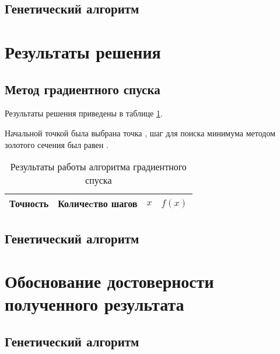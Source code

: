 \documentclass[10pt,a4paper,titlepage]{article}
\begin{document}
\subsection{Генетический алгоритм}

\section{Результаты решения}
\subsection{Метод градиентного спуска}
Результаты решения приведены в таблице \ref{gd-result-table}. 

Начальной точкой была выбрана точка , 
шаг для поиска минимума методом золотого сечения был равен .

\begin{table}[H]
\caption{Результаты работы алгоритма градиентного спуска}
\label{gd-result-table}
\begin{center}
\begin{tabular}{|c|c|c|c|}
\hline
Точность & Количеcтво шагов & $x$ & $f(x)$ \\
\hline

\hline
\end{tabular}
\end{center}
\end{table}

\subsection{Генетический алгоритм}



\section{Обоснование достоверности полученного результата}

\subsection{Генетический алгоритм}
\end{document}
